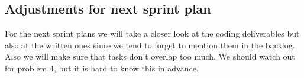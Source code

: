 \documentclass{scrartcl}
\begin{document}
\subsection{Adjustments for next sprint plan}
For the next sprint plans we will take a closer look at the coding deliverables but also at the written ones since we tend to forget to mention them in the backlog.
Also we will make sure that tasks don't overlap too much.
We should watch out for problem 4, but it is hard to know this in advance.
\end{document}

